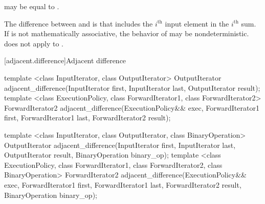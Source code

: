 \begin{itemdescr}
\pnum
\remarks
{} may be equal to .

\pnum
\begin{note}
The difference between  and
 is that 
includes the $i^\text{th}$ input element in the $i^\text{th}$ sum. If  is not
mathematically associative, the behavior of 
may be nondeterministic.  does not apply
 to .
\end{note}
\end{itemdescr}

[adjacent.difference]{Adjacent difference}

%
\begin{itemdecl}
template <class InputIterator, class OutputIterator>
  OutputIterator
    adjacent_difference(InputIterator first, InputIterator last,
                        OutputIterator result);
template <class ExecutionPolicy, class ForwardIterator1, class ForwardIterator2>
  ForwardIterator2
    adjacent_difference(ExecutionPolicy&& exec,
                        ForwardIterator1 first, ForwardIterator1 last,
                        ForwardIterator2 result);

template <class InputIterator, class OutputIterator, class BinaryOperation>
  OutputIterator
    adjacent_difference(InputIterator first, InputIterator last,
                        OutputIterator result,
                        BinaryOperation binary_op);
template <class ExecutionPolicy, class ForwardIterator1, class ForwardIterator2,
          class BinaryOperation>
  ForwardIterator2
    adjacent_difference(ExecutionPolicy&& exec,
                        ForwardIterator1 first, ForwardIterator1 last,
                        ForwardIterator2 result,
                        BinaryOperation binary_op);
\end{itemdecl}

